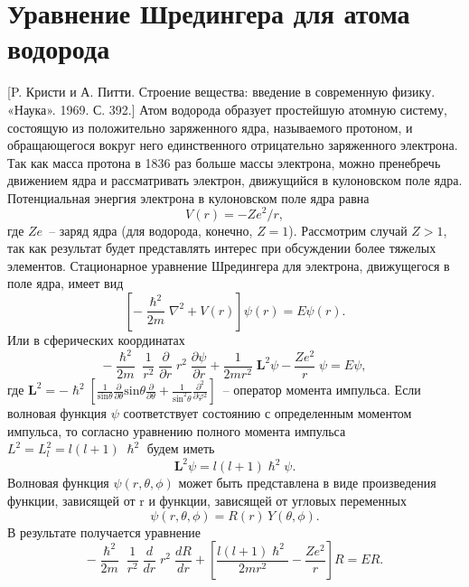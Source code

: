\documentclass[a4paper,14pt, openany, twoside, draft]{extbook} %
\newcommand{\vect}[1]{\mathbf{#1}}
\begin{document}
\section{Уравнение Шредингера для атома водорода}
\label{sec:schredinger}
[P. Кристи и  А. Питти. Строение вещества: введение в современную физику. «Наука». 1969. С. 392.]
Атом водорода образует простейшую атомную систему, состоящую из положительно заряженного ядра, называемого протоном, и обращающегося вокруг него единственного отрицательно заряженного электрона.  Так как масса протона в 1836 раз больше массы электрона, можно пренебречь движением ядра и рассматривать электрон, движущийся в кулоновском поле ядра.  Потенциальная энергия электрона в кулоновском поле ядра равна
\begin{equation}
  \label{eq:potenergy}
V(r)=-Ze^2/r,
\end{equation}
где $Ze$~-- заряд ядра (для водорода, конечно, $Z=1$).   Рассмотрим случай $Z>1$, так как результат будет представлять интерес при обсуждении более тяжелых элементов.  Стационарное уравнение Шредингера для электрона, движущегося в поле ядра, имеет вид
\begin{equation}
 \label{eq:2.16}
\left[-\frac{\hslash^2}{2m}\nabla^2+V(r)\right]\psi (r)=\mathit{E\psi}(r).
\end{equation}
Или в сферических координатах
\begin{equation}
 \label{eq:2.17}
-\frac{\hslash^2}{2m}\;\frac{1}{r^2}\;\frac{\partial}{\partial r}\;r^2\;\frac{\partial \psi}{\partial r}+\frac{1}{2mr^2}\;{\mathbf{L}}^2\psi-\frac{Ze^2}{r}\;\psi=E\psi,
\end{equation}
где $\mathbf{L}^2=-\hslash^2\left[\frac {1}{\text{sin}\theta}\frac{\partial}{\partial \theta }\text{sin}\theta \frac{\partial}{\partial \theta}+\frac {1}{\text{sin}^2\theta}\frac{\partial^2}{\partial \varphi^2}\right]$~-- оператор момента импульса.  Если волновая функция $\psi$ соответствует состоянию с определенным моментом импульса, то согласно уравнению полного момента импульса $L^2=L_{l}^2=l(l+1)\;\hslash^2$ будем иметь
\begin{equation}
 \label{eq:2.18}
{\vect{L}}^2\psi=l(l+1)\hslash^2\psi.
\end{equation}
Волновая функция $\psi(r, \theta, \phi)$ может быть представлена в виде произведения функции, зависящей от r и функции, зависящей от угловых переменных
\begin{equation}
 \label{eq:2.19}
\psi (r, \theta, \phi)=R(r)\,Y(\theta, \phi).
\end{equation}
В результате получается уравнение
\begin{equation}
 \label{eq:2.20}
-\frac{\hslash^2}{2m}\;\frac{1}{r^2}\;\frac{d}{dr}\;r^2\;\frac{dR}{dr}+
\left[\frac{l(l+1)\hslash^2}{2mr^2}-\frac{Ze^2}{r}\right]R=ER.
\end{equation}
\end{document}

